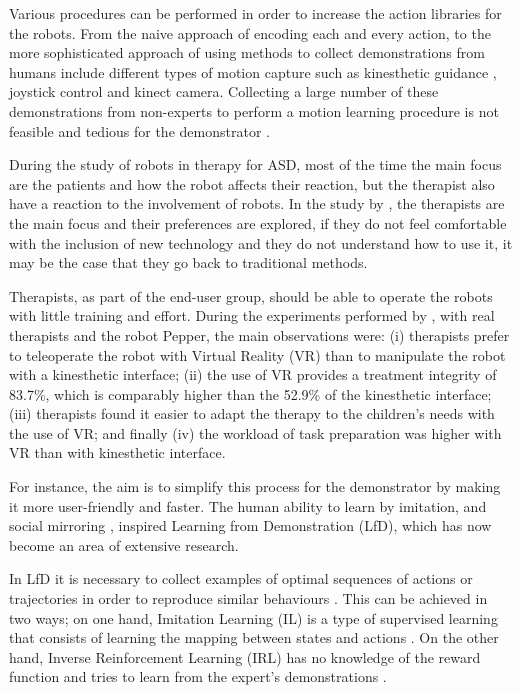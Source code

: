 \documentclass[thesis]{mas_proposal}
\begin{document}
    Various procedures can be performed in order to increase the action libraries for the robots. From the naive approach of encoding each and every action, to the more sophisticated approach of using methods to collect demonstrations from humans include different types of motion capture such as kinesthetic guidance \cite{Kronander2013}, joystick control \cite{Jiang2013} and kinect camera\cite{Assad2020}. Collecting a large number of these demonstrations from non-experts to perform a motion learning procedure is not feasible and tedious for the demonstrator \cite{Chen2022}.
    
    During the study of robots in therapy for ASD, most of the time the main focus are the patients and how the robot affects their reaction, but the therapist also have a reaction to the involvement of robots. In the study by \cite{Kulikovskiy2021}, the therapists are the main focus and their preferences are explored, if they do not feel comfortable with the inclusion of new technology and they do not understand how to use it, it may be the case that they go back to traditional methods.
    
    Therapists, as part of the end-user group, should be able to operate the robots with little training and effort. During the experiments performed by \cite{Kulikovskiy2021}, with real therapists and the robot Pepper, the main observations were: (i) therapists prefer to teleoperate the robot with Virtual Reality (VR) than to manipulate the robot with a kinesthetic interface; (ii) the use of VR provides a treatment integrity of 83.7\%, which is comparably higher than the 52.9\% of the kinesthetic interface; (iii) therapists found it easier to adapt the therapy to the children's needs with the use of VR; and finally (iv) the workload of task preparation was higher with VR than with kinesthetic interface. 
       
    For instance, the aim is to simplify this process for the demonstrator by making it more user-friendly and faster. The human ability to learn by imitation, and social mirroring \cite{Byrne2005}, inspired Learning from Demonstration (LfD), which has now become an area of extensive research.
    
    In LfD it is necessary to collect examples of optimal sequences of actions or trajectories in order to reproduce similar behaviours \cite{Piot2017}. This can be achieved in two ways; on one hand, Imitation Learning (IL) is a type of supervised learning that consists of learning the mapping between states and actions \cite{Dinyari2020}. On the other hand, Inverse Reinforcement Learning (IRL) has no knowledge of the reward function and tries to learn from the expert's demonstrations \cite{Reddy2019}.
    
\end{document}
